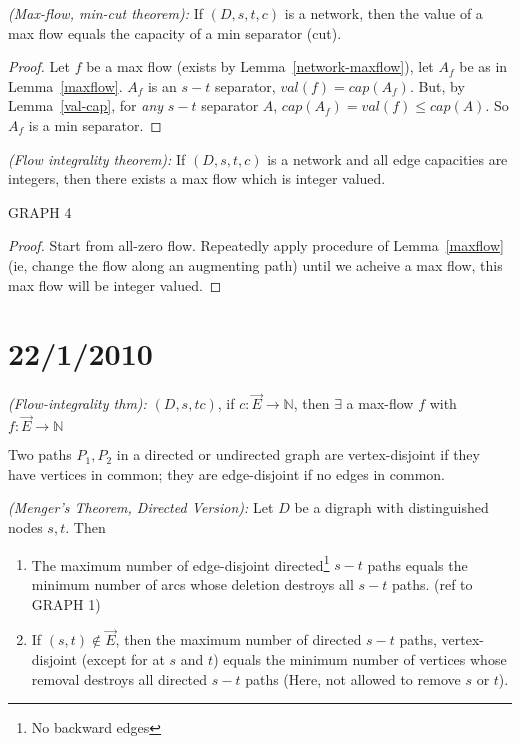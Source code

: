 \documentclass{article}
\begin{document}
\begin{thm}
\emph{(Max-flow, min-cut theorem):} If $(D,s,t,c)$ is a network, then the value of a max flow equals the capacity of a min separator (cut).
\end{thm}

\begin{proof}
Let $f$ be a max flow (exists by Lemma~\ref{network-maxflow}), let $A_f$ be as in Lemma~\ref{maxflow}.  $A_f$ is an $s-t$ separator, $val(f) = cap(A_f)$.  But, by Lemma~\ref{val-cap}, for \emph{any} $s-t$ separator $A$, $cap(A_f)=val(f) \leq cap(A)$.  So $A_f$ is a min separator.
\end{proof}

\begin{thm}
\emph{(Flow integrality theorem):} If $(D,s,t,c)$ is a network and all edge capacities are integers, then there exists a max flow which is integer valued.
\end{thm}

GRAPH 4

\begin{proof}
Start from all-zero flow.  Repeatedly apply procedure of Lemma~\ref{maxflow} (ie, change the flow along an augmenting path) until we acheive a max flow, this max flow will be integer valued.
\end{proof}

\section*{22/1/2010}

\begin{thm}
\emph{(Flow-integrality thm):} $(D,s,tc)$, if $c: \overrightarrow{E} \rightarrow \mathbb{N}$, then $\exists$ a max-flow $f$ with $f: \overrightarrow{E} \rightarrow \mathbb{N}$
\end{thm}

\begin{defn}
Two paths $P_1, P_2$ in a directed or undirected graph are vertex-disjoint if they have vertices in common; they are edge-disjoint if no edges in common.
\end{defn}

\begin{thm}
\emph{(Menger's Theorem, Directed Version):} Let $D$ be a digraph with distinguished nodes $s,t$.  Then 
\begin{enumerate}
\item The maximum number of edge-disjoint directed\footnote{No backward edges} $s-t$ paths equals the minimum number of arcs whose deletion destroys all $s-t$ paths. (ref to GRAPH 1)
\item If $(s,t) \notin \overrightarrow{E}$, then the maximum number of directed $s-t$ paths, vertex-disjoint (except for at $s$ and $t$) equals the minimum number of vertices whose removal destroys all directed $s-t$ paths (Here, not allowed to remove $s$ or $t$).
\end{enumerate}
\end{thm}
\end{document}
